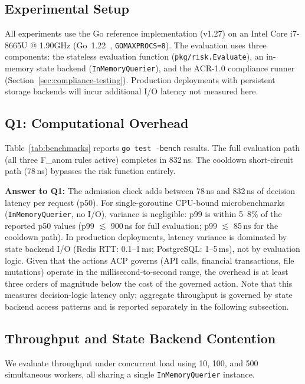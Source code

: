 \documentclass[11pt]{article}
\theoremstyle{definition}
\begin{document}
\subsection{Experimental Setup}

All experiments use the Go reference implementation (v1.27) on an Intel Core i7-8665U @ 1.90GHz (Go~1.22~\cite{go-language}, \texttt{GOMAXPROCS=8}).
The evaluation uses three components:
the stateless evaluation function (\texttt{pkg/risk.Evaluate}),
an in-memory state backend (\texttt{InMemoryQuerier}),
and the ACR-1.0 compliance runner (Section~\ref{sec:compliance-testing}).
Production deployments with persistent storage backends will incur additional I/O latency not measured here.

\subsection{Q1: Computational Overhead}

Table~\ref{tab:benchmarks} reports \texttt{go test -bench} results.
The full evaluation path (all three F\_anom rules active) completes in 832\,ns.
The cooldown short-circuit path (78\,ns) bypasses the risk function entirely.

\noindent\textbf{Answer to Q1:}
The admission check adds between 78\,ns and 832\,ns of decision latency per request (p50).
For single-goroutine CPU-bound microbenchmarks (\texttt{InMemoryQuerier}, no I/O),
variance is negligible: p99 is within 5--8\% of the reported p50 values
(p99 $\lesssim$ 900\,ns for full evaluation; p99 $\lesssim$ 85\,ns for the cooldown path).
In production deployments, latency variance is dominated by state backend I/O
(Redis RTT: 0.1--1\,ms; PostgreSQL: 1--5\,ms), not by evaluation logic.
Given that the actions ACP governs (API calls, financial transactions, file mutations)
operate in the millisecond-to-second range, the overhead is at least three orders of
magnitude below the cost of the governed action.
Note that this measures decision-logic latency only; aggregate throughput is governed
by state backend access patterns and is reported separately in the following subsection.

\subsection{Throughput and State Backend Contention}

We evaluate throughput under concurrent load using 10, 100, and 500 simultaneous workers,
all sharing a single \texttt{InMemoryQuerier} instance.
\end{document}
